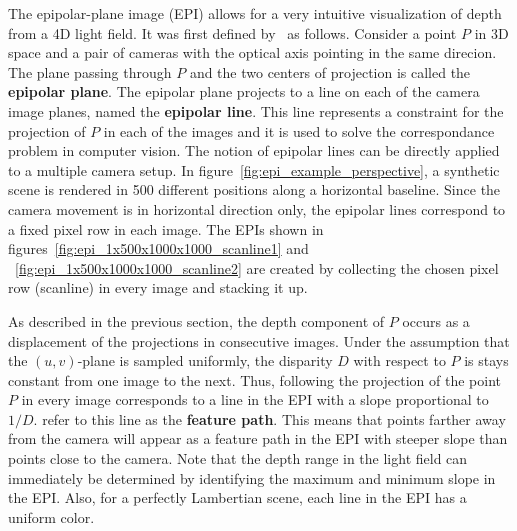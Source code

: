 The epipolar-plane image (EPI) allows for a very intuitive visualization of depth from a 4D light field.
It was first defined by~\cite{EPI} as follows.
Consider a point $P$ in 3D space and a pair of cameras with the optical axis pointing in the same direcion.
The plane passing through $P$ and the two centers of projection is called the \textbf{epipolar plane}.
The epipolar plane projects to a line on each of the camera image planes, named the \textbf{epipolar line}.
This line represents a constraint for the projection of $P$ in each of the images and it is used to solve the correspondance problem in computer vision.
The notion of epipolar lines can be directly applied to a multiple camera setup.
In figure~\ref{fig:epi_example_perspective}, a synthetic scene is rendered in 500 different positions along a horizontal baseline.
Since the camera movement is in horizontal direction only, the epipolar lines correspond to a fixed pixel row in each image.
The EPIs shown in figures~\ref{fig:epi_1x500x1000x1000_scanline1} and ~\ref{fig:epi_1x500x1000x1000_scanline2} are created by collecting the chosen pixel row (scanline) in every image and stacking it up.

As described in the previous section, the depth component of $P$ occurs as a displacement of the projections in consecutive images.
Under the assumption that the $(u, v)$-plane is sampled uniformly, the disparity $D$ with respect to $P$ is stays constant from one image to the next.
Thus, following the projection of the point $P$ in every image corresponds to a line in the EPI with a slope proportional to $1 / D$.
\cite{EPI} refer to this line as the \textbf{feature path}.
This means that points farther away from the camera will appear as a feature path in the EPI with steeper slope than points close to the camera.
Note that the depth range in the light field can immediately be determined by identifying the maximum and minimum slope in the EPI.
Also, for a perfectly Lambertian scene, each line in the EPI has a uniform color.


